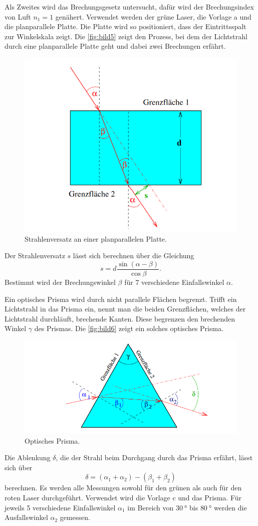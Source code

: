 Als Zweites wird das Brechungsgesetz untersucht, dafür wird der Brechungsindex von Luft $n_1 = 1$ genähert.
Verwendet werden der grüne Laser, die Vorlage a und die planparallele Platte. Die Platte wird so positioniert, dass 
der Eintrittsspalt zur Winkelskala zeigt. Die \autoref{fig:bild5} zeigt den Prozess, bei dem der Lichtstrahl durch eine planparallele
Platte geht und dabei zwei Brechungen erfährt.
\begin{figure}[H]
    \centering
	\includegraphics[width=0.6\linewidth]{content/grafik/strahlen.png}
	\caption{Strahlenversatz an einer planparallelen Platte. \cite{reflex}}
	\label{fig:bild5}
\end{figure}
Der Strahlenversatz $s$ lässt sich berechnen über die Gleichung 
\begin{equation}
	s=d \frac{\sin (\alpha-\beta)}{\cos \beta}.
	\end{equation}
Bestimmt wird der Brechungswinkel $\beta$ für 7 verschiedene Einfallswinkel $\alpha$.

Ein optisches Prisma wird durch nicht parallele Flächen begrenzt. Trifft ein Lichtstrahl in das Prisma ein,
nennt man die beiden Grenzflächen, welches der Lichtstrahl durchläuft, brechende Kanten. Diese begrenzen den brechenden Winkel 
$\gamma$ des Prismas. Die \autoref{fig:bild6}  zeigt ein solches optisches Prisma.
\begin{figure}[H]
    \centering
	\includegraphics[width=0.6\linewidth]{content/grafik/prisma.png}
	\caption{Optisches Prisma. \cite{reflex}}
	\label{fig:bild6}
\end{figure}
Die Ablenkung $\delta$, die der Strahl beim Durchgang durch das Prisma erfährt, lässt sich über 
\begin{equation}
	\delta = \left(\alpha_1 + \alpha_2\right) - \left(\beta_1 + \beta_2\right)
\end{equation}
berechnen.
Es werden alle Messungen sowohl für den grünen als auch für den roten Laser durchgeführt. Verwendet wird die Vorlage c
und das Prisma. Für jeweils 5 verschiedene Einfallswinkel $\alpha_1$ im Bereich von $\qty{30}{°}$ bis $\qty{80}{°}$ werden die Ausfallswinkel $\alpha_2$ gemessen.

